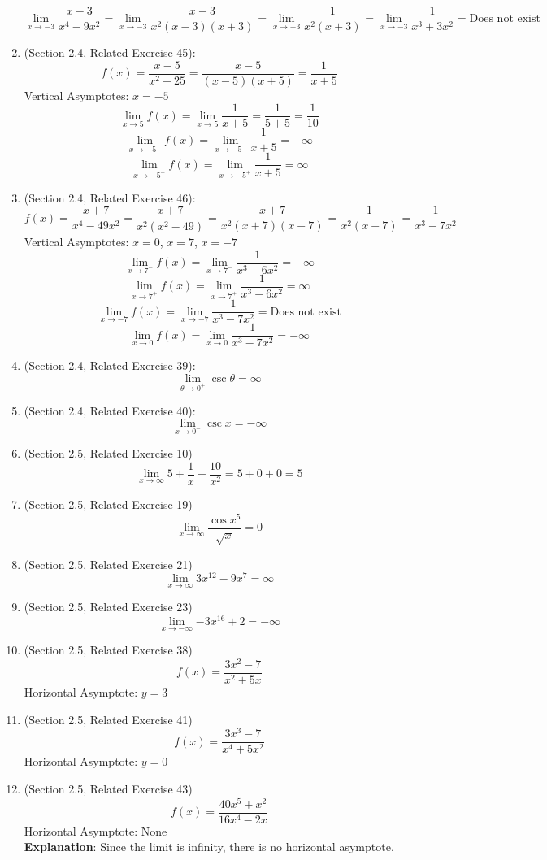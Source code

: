 \documentclass{article}
\begin{document}
\begin{enumerate}
		$$\lim_{x \to -3}{\frac{x - 3}{x^4 - 9x^2}} = \lim_{x \to -3}{\frac{x - 3}{x^2(x-3)(x+3)}} = \lim_{x \to -3}{\frac{1}{x^2(x+3)}} = \lim_{x \to -3}{\frac{1}{x^3+3x^2}} = \text{Does not exist}$$
	\item (Section 2.4, Related Exercise 45):
		$$f(x) = \frac{x-5}{x^2 - 25} = \frac{x-5}{(x-5)(x+5)} = \frac{1}{x+5}$$
		Vertical Asymptotes: $x=-5$
		$$\lim_{x \to 5}{f(x)} = \lim_{x \to 5}{\frac{1}{x+5}} = \frac{1}{5+5} = \frac{1}{10}$$
		$$\lim_{x \to -5^-}{f(x)} = \lim_{x \to -5^-}{\frac{1}{x+5}} = - \infty$$
		$$\lim_{x \to -5^+}{f(x)} = \lim_{x \to -5^+}{\frac{1}{x+5}} = \infty$$
	\item (Section 2.4, Related Exercise 46):
		$$f(x) = \frac{x+7}{x^4 - 49x^2} = \frac{x+7}{x^2(x^2 - 49)} = \frac{x+7}{x^2(x+7)(x-7)} = \frac{1}{x^2(x-7)} = \frac{1}{x^3 - 7x^2}$$
		Vertical Asymptotes: $x = 0$, $x = 7$, $x = -7$
		$$\lim_{x \to 7^-}{f(x)} = \lim_{x \to 7^-}{\frac{1}{x^3 - 6x^2}} = - \infty$$
		$$\lim_{x \to 7^+}{f(x)} = \lim_{x \to 7^+}{\frac{1}{x^3 - 6x^2}} = \infty$$
		$$\lim_{x \to -7}{f(x)} = \lim_{x \to -7}{\frac{1}{x^3 - 7x^2}} = \text{Does not exist}$$
		$$\lim_{x \to 0}{f(x)} = \lim_{x \to 0}{\frac{1}{x^3 - 7x^2}} = - \infty$$
	\item (Section 2.4, Related Exercise 39):
		$$\lim_{\theta \to 0^+}{\csc{\theta}} = \infty$$
	\item (Section 2.4, Related Exercise 40):
		$$\lim_{x \to 0^-}{\csc{x}} = - \infty$$
	\item (Section 2.5, Related Exercise 10)
		$$\lim_{x \to \infty}{5 + \frac{1}{x} + \frac{10}{x^2}} = 5 + 0 + 0 = 5$$
	\item (Section 2.5, Related Exercise 19)
		$$\lim_{x \to \infty}{\frac{\cos{x^5}}{\sqrt{x}}} = 0$$
	\item (Section 2.5, Related Exercise 21)
        $$\lim_{x \to \infty}{3x^12 - 9x^7} = \infty$$
	\item (Section 2.5, Related Exercise 23)
        $$\lim_{x \to - \infty}{-3x^16 + 2} = - \infty$$
	\item (Section 2.5, Related Exercise 38)
        $$f(x) = \frac{3x^2 - 7}{x^2 + 5x}$$
        Horizontal Asymptote: $y = 3$
	\item (Section 2.5, Related Exercise 41)
        $$f(x) = \frac{3x^3 - 7}{x^4 + 5x^2}$$
        Horizontal Asymptote: $y = 0$
	\item (Section 2.5, Related Exercise 43)
        $$f(x) = \frac{40x^5 + x^2}{16x^4 - 2x}$$
        Horizontal Asymptote: None
        \\ \textbf{Explanation}: Since the limit is infinity, there is no horizontal asymptote.

\end{enumerate}
\end{document}

